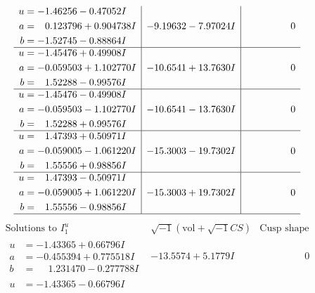 \documentclass[1p]{elsarticle_modified}
\theoremstyle{definition}
\newcommand{\I}{\sqrt{-1}}
\begin{document}
$$\begin{array}{c|c|c}
\begin{aligned}
u &= -1.46256 - 0.47052 I \\
a &= \phantom{-}0.123796 + 0.904738 I \\
b &= -1.52745 - 0.88864 I\end{aligned}
 & -9.19632 - 7.97024 I & \phantom{-0.000000 } 0 \\ \hline\begin{aligned}
u &= -1.45476 + 0.49908 I \\
a &= -0.059503 + 1.102770 I \\
b &= \phantom{-}1.52288 - 0.99576 I\end{aligned}
 & -10.6541 + 13.7630 I & \phantom{-0.000000 } 0 \\ \hline\begin{aligned}
u &= -1.45476 - 0.49908 I \\
a &= -0.059503 - 1.102770 I \\
b &= \phantom{-}1.52288 + 0.99576 I\end{aligned}
 & -10.6541 - 13.7630 I & \phantom{-0.000000 } 0 \\ \hline\begin{aligned}
u &= \phantom{-}1.47393 + 0.50971 I \\
a &= -0.059005 - 1.061220 I \\
b &= \phantom{-}1.55556 + 0.98856 I\end{aligned}
 & -15.3003 - 19.7302 I & \phantom{-0.000000 } 0 \\ \hline\begin{aligned}
u &= \phantom{-}1.47393 - 0.50971 I \\
a &= -0.059005 + 1.061220 I \\
b &= \phantom{-}1.55556 - 0.98856 I\end{aligned}
 & -15.3003 + 19.7302 I & \phantom{-0.000000 } 0\\
 \hline 
 \end{array}$$\newpage$$\begin{array}{c|c|c}  
\text{Solutions to }I^u_{1}& \I (\text{vol} + \sqrt{-1}CS) & \text{Cusp shape}\\
 \hline 
\begin{aligned}
u &= -1.43365 + 0.66796 I \\
a &= -0.455394 + 0.775518 I \\
b &= \phantom{-}1.231470 - 0.277788 I\end{aligned}
 & -13.5574 + 5.1779 I & \phantom{-0.000000 } 0 \\ \hline\begin{aligned}
u &= -1.43365 - 0.66796 I \\

\end{aligned}
\end{array}$$
\end{document}
